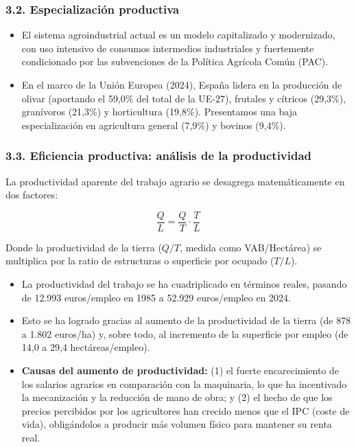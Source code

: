 \subsubsection*{3.2. Especialización productiva}

\begin{itemize}
  \item El sistema agroindustrial actual es un modelo capitalizado y modernizado, con uso intensivo de consumos intermedios industriales y fuertemente condicionado por las subvenciones de la Política Agrícola Común (PAC).
  \item En el marco de la Unión Europea (2024), España lidera en la producción de olivar (aportando el 59,0\% del total de la UE-27), frutales y cítricos (29,3\%), granívoros (21,3\%) y horticultura (19,8\%). Presentamos una baja especialización en agricultura general (7,9\%) y bovinos (9,4\%).
\end{itemize}

\subsubsection*{3.3. Eficiencia productiva: análisis de la productividad}

La productividad aparente del trabajo agrario se desagrega matemáticamente en dos factores:

\[
\frac{Q}{L} = \frac{Q}{T} \cdot \frac{T}{L}
\]

Donde la productividad de la tierra ($Q/T$, medida como VAB/Hectárea) se multiplica por la ratio de estructuras o superficie por ocupado ($T/L$).

\begin{itemize}
  \item La productividad del trabajo se ha cuadriplicado en términos reales, pasando de 12.993 euros/empleo en 1985 a 52.929 euros/empleo en 2024.
  \item Esto se ha logrado gracias al aumento de la productividad de la tierra (de 878 a 1.802 euros/ha) y, sobre todo, al incremento de la superficie por empleo (de 14,0 a 29,4 hectáreas/empleo).
  \item \textbf{Causas del aumento de productividad:} (1) el fuerte encarecimiento de los salarios agrarios en comparación con la maquinaria, lo que ha incentivado la mecanización y la reducción de mano de obra; y (2) el hecho de que los precios percibidos por los agricultores han crecido menos que el IPC (coste de vida), obligándolos a producir más volumen físico para mantener su renta real.
\end{itemize}

